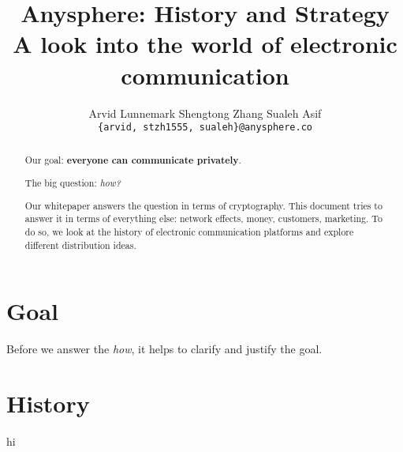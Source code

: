 \documentclass[sigconf, nonacm, balance=false, natbib=false]{acmart}
\title{\textbf{Anysphere: History and Strategy} \\ \vspace{0.4cm} {\huge \normalfont A look into the world of electronic communication}}
\date{\dateinfo}
\author{Arvid Lunnemark \hspace{0.7cm} Shengtong Zhang \hspace{0.7cm} Sualeh Asif \\ \vspace{0.1cm} \nolinkurl{{arvid, stzh1555, sualeh}@anysphere.co} \\ \vspace{0.4cm} \dateinfo}
\begin{document}
\pagecolor{pagecolor}

\begin{abstract}
    Our goal: \textbf{everyone can communicate privately}.

    The big question: \textit{how?}

    Our whitepaper answers the question in terms of cryptography. This document tries to answer it in terms of everything else: network effects, money, customers, marketing. To do so, we look at the history of electronic communication platforms and explore different distribution ideas.
\end{abstract}

\maketitle

\tableofcontents

\section{Goal}

Before we answer the \textit{how}, it helps to clarify and justify the goal.

\section{History}

hi

\printbibliography
\end{document}
